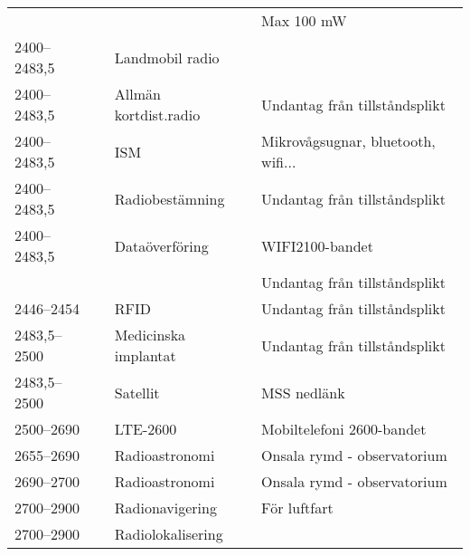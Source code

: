 \documentclass[10pt,swedish,a4paper,twoside]{article}
\begin{document}
\begin{landscape}
\begin{longtable}{llll}
	                   &                    &                         & Max 100 mW                               \\
	2400--2483,5       &                    & Landmobil radio         &  \\
	2400--2483,5       &                    & Allmän kortdist.radio   & Undantag från tillståndsplikt            \\
	2400--2483,5       &                    & ISM                     & Mikrovågsugnar, bluetooth, wifi...        \\
	2400--2483,5       &                    & Radiobestämning         & Undantag från tillståndsplikt            \\
	2400--2483,5       &                    & Dataöverföring          & WIFI2100-bandet                          \\
	                   &                    &                         & Undantag från tillståndsplikt            \\
	2446--2454         &                    & RFID                    & Undantag från tillståndsplikt            \\
	2483,5--2500       &                    & Medicinska implantat    & Undantag från tillståndsplikt            \\
	2483,5--2500       &                    & Satellit                & MSS nedlänk                              \\
	2500--2690         &                    & LTE-2600                & Mobiltelefoni 2600-bandet                \\
	2655--2690         &                    & Radioastronomi          & Onsala rymd - observatorium              \\
	2690--2700         &                    & Radioastronomi          & Onsala rymd - observatorium              \\
	2700--2900         &                    & Radionavigering         & För luftfart                             \\
	2700--2900         &                    & Radiolokalisering       &
\end{longtable}
\end{landscape}
\end{document}
